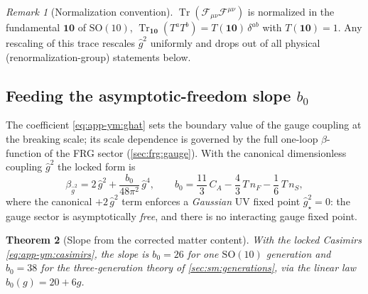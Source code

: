\documentclass[11pt]{article}
\theoremstyle{plain}
\newtheorem{theorem}{Theorem}[section]
\theoremstyle{definition}
\theoremstyle{remark}
\newtheorem{remark}[theorem]{Remark}
\newcommand{\SO}[1]{\mathrm{SO}(#1)}
\newcommand{\Tr}{\operatorname{Tr}}
\newcommand{\SOTen}{\SO{10}}
\newcommand{\ghat}{\hat g}
\begin{document}
\begin{remark}[Normalization convention]\label{rem:app-ym:norm}
$\Tr(\mathcal F_{\mu\nu}\mathcal F^{\mu\nu})$ is normalized in the
fundamental $\mathbf{10}$ of $\SOTen$, $\Tr_{\mathbf{10}}(T^{a}T^{b})
=T(\mathbf{10})\,\delta^{ab}$ with $T(\mathbf{10})=1$. Any rescaling of
this trace rescales $\ghat^{2}$ uniformly and drops out of all
physical (renormalization-group) statements below.
\end{remark}

\subsection{Feeding the asymptotic-freedom slope $b_{0}$}
\label{sec:app-ym:b0}

The coefficient \eqref{eq:app-ym:ghat} sets the boundary value of the
gauge coupling at the breaking scale; its scale dependence is governed
by the full one-loop $\beta$-function of the FRG sector
(\autoref{sec:frg:gauge}). With the canonical dimensionless coupling
$\ghat^{2}$ the locked form is
\begin{equation}\label{eq:app-ym:beta}
  \beta_{\ghat^{2}}
  =2\,\ghat^{2}+\frac{b_{0}}{48\pi^{2}}\,\ghat^{4},
  \qquad
  b_{0}=\frac{11}{3}\,C_{A}-\frac{4}{3}\,T\,n_{F}
        -\frac16\,T\,n_{S} ,
\end{equation}
where the canonical $+2\,\ghat^{2}$ term enforces a \emph{Gaussian} UV
fixed point $\ghat^{2}_{\star}=0$: the gauge sector is asymptotically
\emph{free}, and there is no interacting gauge fixed point.

\begin{theorem}[Slope from the corrected matter content]
\label{thm:app-ym:b0}
With the locked Casimirs \eqref{eq:app-ym:casimirs}, the slope is
$b_{0}=26$ for one $\SOTen$ generation and $b_{0}=38$ for the
three-generation theory of \autoref{sec:sm:generations}, via the linear
law $b_{0}(g)=20+6g$.
\end{theorem}
\end{document}

